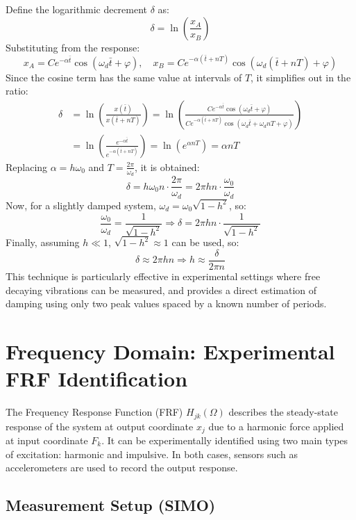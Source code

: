 Define the logarithmic decrement \( \delta \) as:
\[
\delta = \ln \left( \frac{x_A}{x_B} \right)
\]
Substituting from the response:
\[
x_A = C e^{-\alpha \bar{t}} \cos(\omega_d \bar{t} + \varphi), \quad
x_B = C e^{-\alpha (\bar{t} + nT)} \cos(\omega_d (\bar{t} + nT) + \varphi)
\]
Since the cosine term has the same value at intervals of \( T \), it simplifies out in the ratio:
\begin{align*}
\delta &= \ln \left( \frac{x(\bar{t})}{x(\bar{t} + nT)} \right)
= \ln \left( \frac{C e^{-\alpha \bar{t}} \cos(\omega_d \bar{t} + \varphi)}{C e^{-\alpha (\bar{t} + nT)} \cos(\omega_d \bar{t} + \omega_d nT + \varphi)} \right) \\
&= \ln \left( \frac{e^{-\alpha \bar{t}}}{e^{-\alpha (\bar{t} + nT)}} \right)
= \ln \left( e^{\alpha nT} \right)
= \alpha nT
\end{align*}
Replacing \( \alpha = h \omega_0 \) and \( T = \frac{2\pi}{\omega_d} \), it is obtained:
\[
\delta = h \omega_0 n \cdot \frac{2\pi}{\omega_d} = 2\pi h n \cdot \frac{\omega_0}{\omega_d}
\]
Now, for a slightly damped system, \( \omega_d = \omega_0 \sqrt{1 - h^2} \), so:
\[
\frac{\omega_0}{\omega_d} = \frac{1}{\sqrt{1 - h^2}} \Rightarrow
\delta = 2\pi h n \cdot \frac{1}{\sqrt{1 - h^2}}
\]
Finally, assuming \( h \ll 1 \), \( \sqrt{1 - h^2} \approx 1 \) can be used, so:
\[
\delta \approx 2\pi h n \Rightarrow
h \approx \frac{\delta}{2\pi n}
\]
This technique is particularly effective in experimental settings where free decaying vibrations can be measured, and provides a direct estimation of damping using only two peak values spaced by a known number of periods.

\section{Frequency Domain: Experimental FRF Identification}

The Frequency Response Function (FRF) \( H_{jk}(\Omega) \) describes the steady-state response of the system at output coordinate \( x_j \) due to a harmonic force applied at input coordinate \( F_k \). It can be experimentally identified using two main types of excitation: harmonic and impulsive. In both cases, sensors such as accelerometers are used to record the output response.

\subsection{Measurement Setup (SIMO)}

